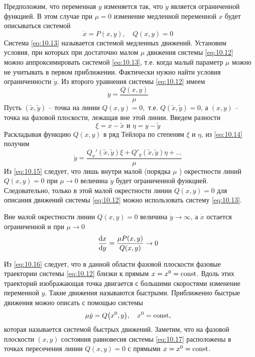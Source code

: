 Предположим, что переменная $y$ изменяется так, что $\dot y$ является
ограниченной функцией. В этом случае при $\mu = 0$ изменение медленной
переменной $x$ будет описываться системой
\begin{equation}
        \label{eq:10.13}
        \dot x = P(x,y), \quad Q(x,y) = 0
\end{equation}
Система \eqref{eq:10.13} называется системой медленных движений. Установим условия,
при которых при достаточно малом $\mu$ движения системы \eqref{eq:10.12}
можно аппроксимировать системой \eqref{eq:10.13}, т.е. когда малый параметр
$\mu$ можно не учитывать в первом приближении. Фактически нужно найти условия
ограниченности $\dot y$. Из второго уравнения системы \eqref{eq:10.12} имеем
\begin{equation}
        \label{eq:10.14}
        \dot y = \frac{Q(x,y)}{\mu}
\end{equation}
Пусть $(\tilde x, \tilde y)$ -- точка на линии $Q(x,y) = 0,$ т.е. 
$Q(\tilde x, \tilde y)=0$, а $(x,y)$ -- точка на фазовой плоскости, лежащая вне этой линии.
Введем разности
\begin{equation}
        \label{eq:}
        \xi = x - \tilde x \text{ и } \eta = y - \tilde y
\end{equation}
Раскладывая функцию $Q(x,y)$ в ряд Тейлора по степеням $\xi$ и $\eta$, из \eqref{eq:10.14} получим
\begin{equation}
        \label{eq:10.15}
        \dot y = \frac{ Q_{x}'(\tilde x,\tilde y)\xi + Q'_y (\tilde x, \tilde y) \eta + \dots}{\mu}
\end{equation}
Из \eqref{eq:10.15} следует, что лишь внутри малой (порядка $\mu$ ) окрестности линий
$Q(x,y) = 0$ при $\mu \to 0$ величина $\dot y$ будет ограниченной функцией. 
Следовательно, только в этой малой окрестности линии $Q(x,y) = 0$ для описания 
движений системы \eqref{eq:10.12} можно использовать систему \eqref{eq:10.13}.

Вне малой окрестности линии $Q(x,y) = 0$ величина $\dot y \to \infty$, а $\dot x$ 
остается ограниченной и при $\mu\to 0$ 
\begin{equation}
        \label{eq:10.16}
        \dv{x}{y} = \frac{\mu P(x,y)}{Q(x,y)} \to 0
\end{equation}

Из \eqref{eq:10.16} следует, что в данной области фазовой плоскости фазовые траектории 
системы \eqref{eq:10.12} близки к прямым $x=x^{0}=\textrm{const}$. Вдоль этих траекторий изображающая
точка двигается с большими скоростями изменение переменной $y$. Такие движения называются быстрыми.
Приближенно быстрые движения можно описать с помощью системы
\begin{equation}
        \label{eq:10.17}
        \mu \dot y = Q\qty(x^{0}, y),\quad x^0 = \textrm{const},
\end{equation}
которая называется системой быстрых движений. Заметим, что на фазовой плоскости 
$(x,y)$ состояния равновесия системы \eqref{eq:10.17} расположены в точках пересечения линии
$Q(x,y) = 0$ с прямыми $x= x^{0}=\textrm{const}$.

